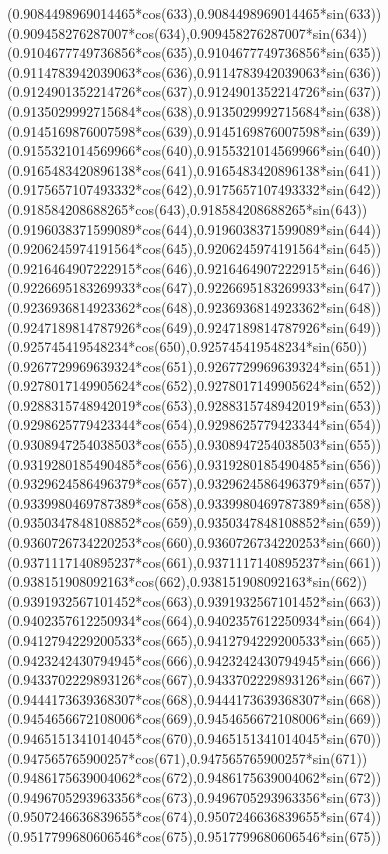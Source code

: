 {({0.9084498969014465*cos(633)},{0.9084498969014465*sin(633)})
({0.909458276287007*cos(634)},{0.909458276287007*sin(634)})
({0.9104677749736856*cos(635)},{0.9104677749736856*sin(635)})
({0.9114783942039063*cos(636)},{0.9114783942039063*sin(636)})
({0.9124901352214726*cos(637)},{0.9124901352214726*sin(637)})
({0.9135029992715684*cos(638)},{0.9135029992715684*sin(638)})
({0.9145169876007598*cos(639)},{0.9145169876007598*sin(639)})
({0.9155321014569966*cos(640)},{0.9155321014569966*sin(640)})
({0.9165483420896138*cos(641)},{0.9165483420896138*sin(641)})
({0.9175657107493332*cos(642)},{0.9175657107493332*sin(642)})
({0.918584208688265*cos(643)},{0.918584208688265*sin(643)})
({0.9196038371599089*cos(644)},{0.9196038371599089*sin(644)})
({0.9206245974191564*cos(645)},{0.9206245974191564*sin(645)})
({0.9216464907222915*cos(646)},{0.9216464907222915*sin(646)})
({0.9226695183269933*cos(647)},{0.9226695183269933*sin(647)})
({0.9236936814923362*cos(648)},{0.9236936814923362*sin(648)})
({0.9247189814787926*cos(649)},{0.9247189814787926*sin(649)})
({0.925745419548234*cos(650)},{0.925745419548234*sin(650)})
({0.9267729969639324*cos(651)},{0.9267729969639324*sin(651)})
({0.9278017149905624*cos(652)},{0.9278017149905624*sin(652)})
({0.9288315748942019*cos(653)},{0.9288315748942019*sin(653)})
({0.9298625779423344*cos(654)},{0.9298625779423344*sin(654)})
({0.9308947254038503*cos(655)},{0.9308947254038503*sin(655)})
({0.9319280185490485*cos(656)},{0.9319280185490485*sin(656)})
({0.9329624586496379*cos(657)},{0.9329624586496379*sin(657)})
({0.9339980469787389*cos(658)},{0.9339980469787389*sin(658)})
({0.9350347848108852*cos(659)},{0.9350347848108852*sin(659)})
({0.9360726734220253*cos(660)},{0.9360726734220253*sin(660)})
({0.9371117140895237*cos(661)},{0.9371117140895237*sin(661)})
({0.938151908092163*cos(662)},{0.938151908092163*sin(662)})
({0.9391932567101452*cos(663)},{0.9391932567101452*sin(663)})
({0.9402357612250934*cos(664)},{0.9402357612250934*sin(664)})
({0.9412794229200533*cos(665)},{0.9412794229200533*sin(665)})
({0.9423242430794945*cos(666)},{0.9423242430794945*sin(666)})
({0.9433702229893126*cos(667)},{0.9433702229893126*sin(667)})
({0.9444173639368307*cos(668)},{0.9444173639368307*sin(668)})
({0.9454656672108006*cos(669)},{0.9454656672108006*sin(669)})
({0.9465151341014045*cos(670)},{0.9465151341014045*sin(670)})
({0.947565765900257*cos(671)},{0.947565765900257*sin(671)})
({0.9486175639004062*cos(672)},{0.9486175639004062*sin(672)})
({0.9496705293963356*cos(673)},{0.9496705293963356*sin(673)})
({0.9507246636839655*cos(674)},{0.9507246636839655*sin(674)})
({0.9517799680606546*cos(675)},{0.9517799680606546*sin(675)})
}

